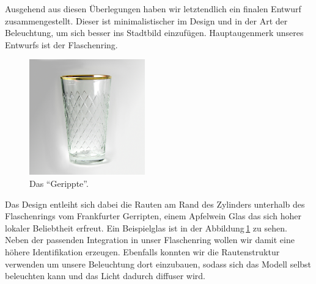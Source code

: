     Ausgehend aus diesen Überlegungen haben wir letztendlich ein finalen Entwurf zusammengestellt. Dieser ist minimalistischer im Design und in der Art der Beleuchtung, um sich besser ins Stadtbild einzufügen.
    Hauptaugenmerk unseres Entwurfs ist der Flaschenring.

    \begin{figure}[H]
        \centering
        \includegraphics[width=5cm]{media/01_project/picture_geripptes.jpg}
        \caption{Das \enquote{Gerippte}.}
        \label{fig:picture_gerippte}
    \end{figure}

    Das Design entleiht sich dabei die Rauten am Rand des Zylinders unterhalb des Flaschenrings vom Frankfurter Gerripten, einem Apfelwein Glas das sich hoher lokaler Beliebtheit erfreut. Ein Beispielglas ist in der Abbildung\,\ref{fig:picture_gerippte} zu sehen. Neben der passenden Integration in unser Flaschenring wollen wir damit eine höhere Identifikation erzeugen.
    Ebenfalls konnten wir die Rautenstruktur verwenden um unsere Beleuchtung dort einzubauen, sodass sich das Modell selbst beleuchten kann und das Licht dadurch diffuser wird.
    
